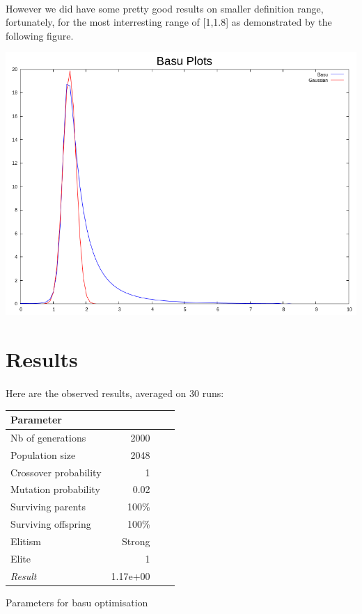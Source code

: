 \documentclass{article}
\begin{document}
    \paragraph{} %
    \label{par:}
      However we did have some pretty good results on smaller definition range,
      fortunately, for the most interresting range of [1,1.8] as demonstrated by the
      following figure.

    \includegraphics[scale=0.3]{basu_best}
    
   
   \section{Results} %
   \label{sec:Result}
   \paragraph{} %
   
     \label{par:}
       Here are the observed results, averaged on 30 runs:

    \begin{small} 
    \begin{tabular}{lrrr}
      Parameter &  \\
      \hline
      Nb of generations & 2000 \\
      Population size & 2048  \\
      Crossover probability & 1 \\
      Mutation probability & 0.02\\
      Surviving parents & 100\%  \\
      Surviving offspring& 100\% \\
      Elitism & Strong \\
      Elite & 1 \\ \hline
      \emph{Result} & 1.17e+00 \\
      \hline 
      \end{tabular}
      \caption{Parameters for basu optimisation}

    \end{small}
\end{document}
